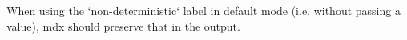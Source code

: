 When using the `non-deterministic` label in default mode
(i.e. without passing a value), mdx should preserve that in the output.

